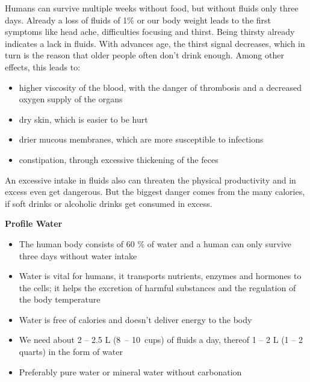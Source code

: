 \documentclass[../main.tex]{subfiles}
\begin{document}
  Humans can survive multiple weeks without food, but without fluids only three days.
  Already a loss of fluids of 1\% or our body weight leads to the first symptoms like head ache, difficulties focusing and thirst.
  Being thirsty already indicates a lack in fluids.
  With advances age, the thirst signal decreases, which in turn is the reason that older people often don't drink enough.
  Among other effects, this leads to:
  \begin{itemize}
  \item higher viscosity of the blood, with the danger of thrombosis and a decreased oxygen supply of the organs
  \item dry skin, which is easier to be hurt
  \item drier mucous membranes, which are more susceptible to infections
    \item constipation, through excessive thickening of the feces
    \end{itemize}

    An excessive intake in fluids also can threaten the physical productivity and in excess even get dangerous.
    But the biggest danger comes from the many calories, if soft drinks or alcoholic drinks get consumed in excess. 

 
\vspace{5mm}
\noindent
\begin{fminipage}{\textwidth}
  \textbf{Profile Water}
  \begin{itemize}
  \item The human body consists of 60 \% of water and a human can only survive three days without water intake
  \item Water is vital for humans, it transports nutrients, enzymes and hormones to the cells; it helps the excretion of harmful substances and the regulation of the body temperature
  \item Water is free of calories and doesn't deliver energy to the body
  \item We need about 2 -- 2.5 L (8\ -- 10\ cups) of fluids a day, thereof 1 -- 2 L (1 -- 2 quarts) in the form of water
    \item Preferably pure water or mineral water without carbonation
  \end{itemize}
\end{fminipage}
\end{document}
